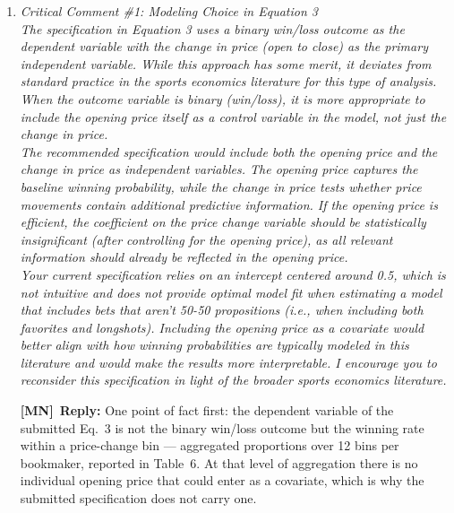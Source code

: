 \documentclass[letterpaper,12pt]{article}
\newcounter{b}
\newcommand{\ReplyMN}[1]{\par\noindent%
  \textcolor{mncol}{\textbf{[MN]}}~\textbf{Reply:} #1}
\begin{document}
\begin{enumerate}


\item \textit{Critical Comment \#1: Modeling Choice in Equation 3\\[6pt]
The specification in Equation 3 uses a binary win/loss outcome as the dependent variable with the change in price (open to close) as the primary independent variable. While this approach has some merit, it deviates from standard practice in the sports economics literature for this type of analysis. When the outcome variable is binary (win/loss), it is more appropriate to include the opening price itself as a control variable in the model, not just the change in price.\\[6pt]
The recommended specification would include both the opening price and the change in price as independent variables. The opening price captures the baseline winning probability, while the change in price tests whether price movements contain additional predictive information. If the opening price is efficient, the coefficient on the price change variable should be statistically insignificant (after controlling for the opening price), as all relevant information should already be reflected in the opening price.\\[6pt]
Your current specification relies on an intercept centered around 0.5, which is not intuitive and does not provide optimal model fit when estimating a model that includes bets that aren't 50-50 propositions (i.e., when including both favorites and longshots). Including the opening price as a covariate would better align with how winning probabilities are typically modeled in this literature and would make the results more interpretable. I encourage you to reconsider this specification in light of the broader sports economics literature.}

\ReplyMN{One point of fact first: the dependent variable of the submitted Eq.~3 is not the binary win/loss outcome but the winning rate within a price-change bin --- aggregated proportions over 12 bins per bookmaker, reported in Table~6. At that level of aggregation there is no individual opening price that could enter as a covariate, which is why the submitted specification does not carry one.

}
\end{enumerate}
\end{document}
